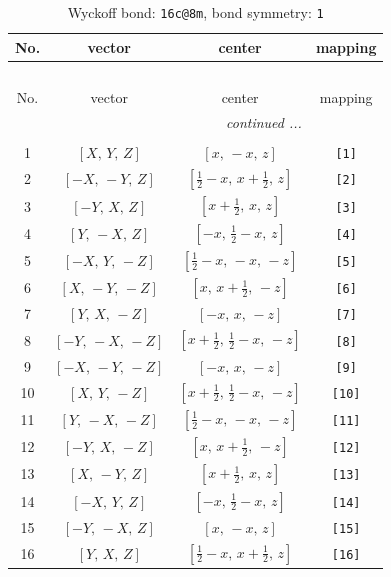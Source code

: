 \documentclass[fleqn,8pt]{jsarticle}
\begin{document}
\begin{longtable}{cccc}
\caption{Wyckoff bond: {\tt 16c@8m}, bond symmetry: {\tt 1}}
 \\
 \hline \hline
No. & vector & center & mapping \\ \hline \endfirsthead

\multicolumn{3}{l}{\tablename\ \thetable{}} \\
 \hline \hline
No. & vector & center & mapping \\ \hline \endhead

 \hline \hline
\multicolumn{3}{r}{\footnotesize\it continued ...} \\ \endfoot

 \hline \hline
\multicolumn{3}{r}{} \\ \endlastfoot

1 & $\left[ X,\, Y,\, Z \right]$ & $\left[ x,\, - x,\, z \right]$ & {\tt [1]} \\ \hline
2 & $\left[ - X,\, - Y,\, Z \right]$ & $\left[ \frac{1}{2} - x,\, x + \frac{1}{2},\, z \right]$ & {\tt [2]} \\ \hline
3 & $\left[ - Y,\, X,\, Z \right]$ & $\left[ x + \frac{1}{2},\, x,\, z \right]$ & {\tt [3]} \\ \hline
4 & $\left[ Y,\, - X,\, Z \right]$ & $\left[ - x,\, \frac{1}{2} - x,\, z \right]$ & {\tt [4]} \\ \hline
5 & $\left[ - X,\, Y,\, - Z \right]$ & $\left[ \frac{1}{2} - x,\, - x,\, - z \right]$ & {\tt [5]} \\ \hline
6 & $\left[ X,\, - Y,\, - Z \right]$ & $\left[ x,\, x + \frac{1}{2},\, - z \right]$ & {\tt [6]} \\ \hline
7 & $\left[ Y,\, X,\, - Z \right]$ & $\left[ - x,\, x,\, - z \right]$ & {\tt [7]} \\ \hline
8 & $\left[ - Y,\, - X,\, - Z \right]$ & $\left[ x + \frac{1}{2},\, \frac{1}{2} - x,\, - z \right]$ & {\tt [8]} \\ \hline
9 & $\left[ - X,\, - Y,\, - Z \right]$ & $\left[ - x,\, x,\, - z \right]$ & {\tt [9]} \\ \hline
10 & $\left[ X,\, Y,\, - Z \right]$ & $\left[ x + \frac{1}{2},\, \frac{1}{2} - x,\, - z \right]$ & {\tt [10]} \\ \hline
11 & $\left[ Y,\, - X,\, - Z \right]$ & $\left[ \frac{1}{2} - x,\, - x,\, - z \right]$ & {\tt [11]} \\ \hline
12 & $\left[ - Y,\, X,\, - Z \right]$ & $\left[ x,\, x + \frac{1}{2},\, - z \right]$ & {\tt [12]} \\ \hline
13 & $\left[ X,\, - Y,\, Z \right]$ & $\left[ x + \frac{1}{2},\, x,\, z \right]$ & {\tt [13]} \\ \hline
14 & $\left[ - X,\, Y,\, Z \right]$ & $\left[ - x,\, \frac{1}{2} - x,\, z \right]$ & {\tt [14]} \\ \hline
15 & $\left[ - Y,\, - X,\, Z \right]$ & $\left[ x,\, - x,\, z \right]$ & {\tt [15]} \\ \hline
16 & $\left[ Y,\, X,\, Z \right]$ & $\left[ \frac{1}{2} - x,\, x + \frac{1}{2},\, z \right]$ & {\tt [16]} \\
\end{longtable}
\end{document}
